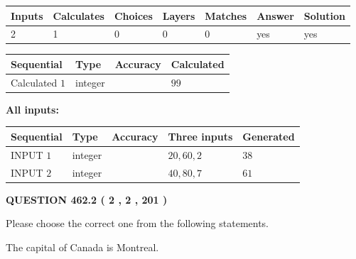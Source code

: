 \documentclass[12pt]{article}
\begin{document}
 

 
   
   
   
   
\noindent\begin{tabular}{|l|l|l|l|l|l|l|}
 \hline
Inputs & Calculates & Choices & Layers & Matches & Answer & Solution \\ \hline
 2  & 
 1  & 
 0
  & 
 0  & 
 0  & 
  yes & 
  yes 
  \\ \hline
 \end{tabular}
   
   
   
   
\noindent{}
   
   
  
  
\noindent\begin{tabular}{|l|l|l|l|}
\hline
 Sequential & Type & Accuracy & Calculated \\ 
\hline
 
 
  Calculated $  1 $ & integer &  & 
  $ 99 $ 
 \\  \hline  
 \end{tabular}
   
   
   
   
\noindent\vspace{0.1in}\hspace{-0.08in} {\textbf{\Large{All inputs: }}}
   
   
  
  
\noindent\begin{tabular}{|l|l|l|l|l|}
\hline
 Sequential & Type & Accuracy & Three inputs & Generated \\ 
\hline
 
 
  INPUT $  1 $ & integer &  & $
 20
 , 
 60
 , 
 2
 $ & $ 38 $ 
 \\  \hline  
 
 
  INPUT $  2 $ & integer &  & $
 40
 , 
 80
 , 
 7
 $ & $ 61 $ 
 \\  \hline  
 \end{tabular}
   
   
  
\vspace{0.2in}
  
{\textbf{\Large{QUESTION
462.2 
 ( 2 , 2 , 201 )
}}}
  
  
Please choose the correct one from the following statements.
 
 
The capital of Canada is Montreal.
 
\end{document}
